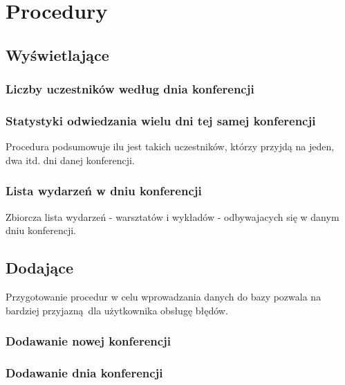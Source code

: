 \documentclass[12pt]{article}
\begin{document}
\section{Procedury}

\subsection{Wyświetlające}
\subsubsection{Liczby uczestników według dnia konferencji}


\subsubsection{Statystyki odwiedzania wielu dni tej samej konferencji}

Procedura podsumowuje ilu jest takich uczestników, którzy przyjdą na jeden, dwa itd. dni danej konferencji.



\subsubsection{Lista wydarzeń w dniu konferencji}
Zbiorcza lista wydarzeń - warsztatów i wykładów - odbywajacych się w danym dniu konferencji.


\subsection{Dodające}
Przygotowanie procedur w celu wprowadzania danych do bazy pozwala na bardziej przyjazną dla użytkownika obsługę błędów.

\subsubsection{Dodawanie nowej konferencji}


\subsubsection{Dodawanie dnia konferencji}

\end{document}

